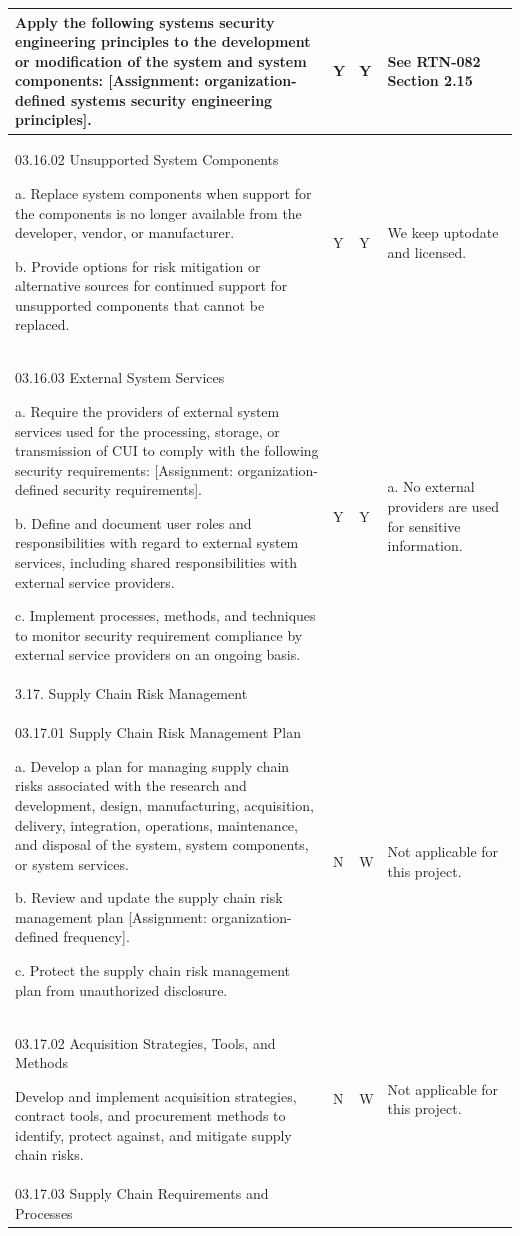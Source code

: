 \begin{longtable} {|p{}|p{}|p{}|p{} |}
{Apply the following systems security engineering principles to the development or modification of the system and system components: [Assignment: organization- defined systems security engineering principles].}&{Y}&{Y}&{See RTN-082 Section 2.15} \\ \hline
{03.16.02 Unsupported System Components

a. Replace system components when support for the components is no longer available from the developer, vendor, or manufacturer.

b. Provide options for risk mitigation or alternative sources for continued support for unsupported components that cannot be replaced.}&{Y}&{Y}&{We keep uptodate and licensed.} \\ \hline
{03.16.03 External System Services

a. Require the providers of external system services used for the processing, storage, or transmission of CUI to comply with the following security requirements: [Assignment: organization-defined security requirements].

b. Define and document user roles and responsibilities with regard to external system services, including shared responsibilities with external service providers.

c. Implement processes, methods, and techniques to monitor security requirement compliance by external service providers on an ongoing basis.}&{Y}&{Y}&{a. No external providers are used for sensitive information.} \\ \hline
{3.17. Supply Chain Risk Management}&&& \\ \hline
{03.17.01 Supply Chain Risk Management Plan

a. Develop a plan for managing supply chain risks associated with the research and development, design, manufacturing, acquisition, delivery, integration, operations, maintenance, and disposal of the system, system components, or system services.

b. Review and update the supply chain risk management plan [Assignment: organization-defined frequency].

c. Protect the supply chain risk management plan from unauthorized disclosure.}&{N}&{W}&{Not applicable for this project.} \\ \hline
{03.17.02 Acquisition Strategies, Tools, and Methods

Develop and implement acquisition strategies, contract tools, and procurement methods to identify, protect against, and mitigate supply chain risks.  }&{N}&{W}&{Not applicable for this project.} \\ \hline
{03.17.03 Supply Chain Requirements and Processes

}
\end{longtable}
